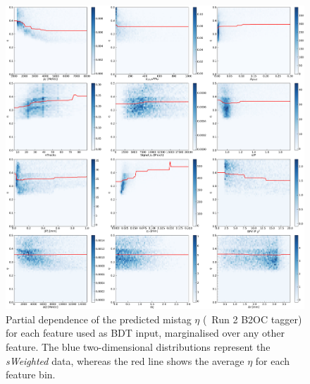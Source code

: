 \begin{figure}[t]
        \centering
        \includegraphics[width=\textwidth]{04FlavourTagging/figs/OSelectronOpt/2018-04-07-vibattis-OSElectron-bdt-calibration-sWeights_Run2_Bu2D0pi/PartialDependence_RunIIcuts.pdf}
        \vspace{-2mm}
        \caption{Partial dependence of the predicted mistag $\eta$ (\OSe~Run 2 B2OC tagger) for each feature used as BDT input, marginalised over any other feature. The blue two-dimensional distributions represent the \emph{sWeighted} data, whereas the red line shows the average $\eta$ for each feature bin.}
        \label{fig:OSepartialdependenceRunIIB2OC}
\end{figure}

